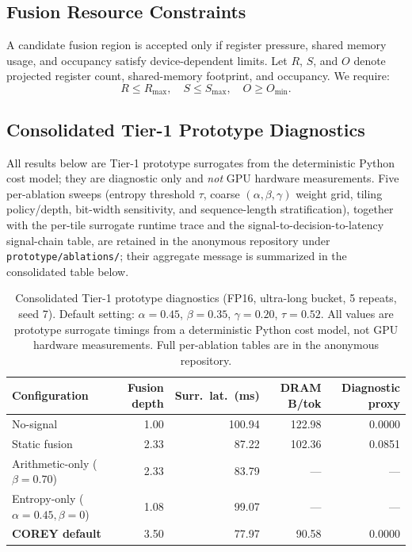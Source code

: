 \subsection{Fusion Resource Constraints}
A candidate fusion region is accepted only if register pressure, shared memory usage, and occupancy satisfy device-dependent limits. Let \(R\), \(S\), and \(O\) denote projected register count, shared-memory footprint, and occupancy. We require:
\begin{equation}
  R \le R_{\max}, \quad S \le S_{\max}, \quad O \ge O_{\min}.
\end{equation}

\subsection{Consolidated Tier-1 Prototype Diagnostics}
\label{sec:prototype-consolidated}
\label{sec:appendix_ablations}
\label{sec:prototype_signal_chain}
\label{sec:full_grid_ablation}
\label{sec:grid_ablation}

All results below are Tier-1 prototype surrogates from the deterministic Python cost model; they are diagnostic only and \emph{not} GPU hardware measurements. Five per-ablation sweeps (entropy threshold $\tau$, coarse $(\alpha,\beta,\gamma)$ weight grid, tiling policy/depth, bit-width sensitivity, and sequence-length stratification), together with the per-tile surrogate runtime trace and the signal-to-decision-to-latency signal-chain table, are retained in the anonymous repository under \texttt{prototype/ablations/}; their aggregate message is summarized in the consolidated table below.

\begin{table}[!t]
\centering
\caption{Consolidated Tier-1 prototype diagnostics (FP16, ultra-long bucket, 5 repeats, seed 7). Default setting: $\alpha{=}0.45$, $\beta{=}0.35$, $\gamma{=}0.20$, $\tau{=}0.52$. All values are prototype surrogate timings from a deterministic Python cost model, not GPU hardware measurements. Full per-ablation tables are in the anonymous repository.}
\label{tab:prototype_consolidated}
\label{tab:full_grid_ablation}
\label{tab:tile_trace_surrogate}
\label{tab:signal_chain}
\label{tab:ablation_tau}
\label{tab:grid_ablation}
\label{tab:tiling_depth}
\label{tab:ablation_precision}
\label{tab:ablation_length}
\small
\begin{tabular}{lrrrr}
\toprule
Configuration & Fusion depth & Surr.\ lat.\ (ms) & DRAM B/tok & Diagnostic proxy \\
\midrule
No-signal                                 & 1.00 & 100.94 & 122.98 & 0.0000 \\
Static fusion                             & 2.33 & 87.22  & 102.36 & 0.0851 \\
Arithmetic-only ($\beta{=}0.70$)          & 2.33 & 83.79  & ---    & ---    \\
Entropy-only ($\alpha{=}0.45, \beta{=}0$) & 1.08 & 99.07  & ---    & ---    \\
\textbf{COREY default}                    & 3.50 & 77.97  & 90.58  & 0.0000 \\
\bottomrule
\end{tabular}
\end{table}

